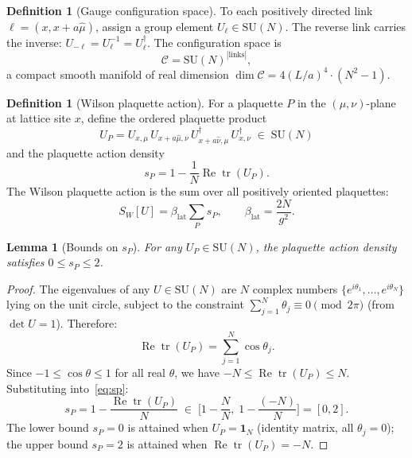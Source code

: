 \documentclass[12pt,a4paper]{article}
\theoremstyle{plain}
\newtheorem{lemma}[theorem]{Lemma}
\theoremstyle{definition}
\newtheorem{definition}[theorem]{Definition}
\theoremstyle{remark}
\begin{document}
\begin{definition}[Gauge configuration space]\label{def:config}
To each positively directed link $\ell = (x, x+a\hat{\mu})$, assign a group element $U_\ell \in \mathrm{SU}(N)$. The reverse link carries the inverse: $U_{-\ell} = U_\ell^{-1} = U_\ell^\dagger$. The configuration space is
\begin{equation}\label{eq:config}
\mathcal{C} = \mathrm{SU}(N)^{|\mathrm{links}|},
\end{equation}
a compact smooth manifold of real dimension $\dim\mathcal{C} = 4(L/a)^4 \cdot (N^2-1)$.
\end{definition}

\begin{definition}[Wilson plaquette action]\label{def:wilson}
For a plaquette $P$ in the $(\mu,\nu)$-plane at lattice site $x$, define the ordered plaquette product
\begin{equation}\label{eq:UP}
U_P = U_{x,\mu}\, U_{x+a\hat\mu,\nu}\, U_{x+a\hat\nu,\mu}^\dagger\, U_{x,\nu}^\dagger \;\in\; \mathrm{SU}(N)
\end{equation}
and the plaquette action density
\begin{equation}\label{eq:sp}
s_P = 1 - \frac{1}{N}\operatorname{Re}\operatorname{tr}(U_P).
\end{equation}
The Wilson plaquette action is the sum over all positively oriented plaquettes:
\begin{equation}\label{eq:SW}
S_W[U] = \beta_{\mathrm{lat}}\sum_{P} s_P, \qquad \beta_{\mathrm{lat}} = \frac{2N}{g^2}.
\end{equation}
\end{definition}

\begin{lemma}[Bounds on $s_P$]\label{lem:sp}
For any $U_P\in\mathrm{SU}(N)$, the plaquette action density satisfies $0\leq s_P\leq 2$.
\end{lemma}

\begin{proof}
The eigenvalues of any $U\in\mathrm{SU}(N)$ are $N$ complex numbers $\{e^{i\theta_1},\ldots,e^{i\theta_N}\}$ lying on the unit circle, subject to the constraint $\sum_{j=1}^N\theta_j\equiv 0\pmod{2\pi}$ (from $\det U=1$). Therefore:
\begin{equation}
\operatorname{Re}\operatorname{tr}(U_P) = \sum_{j=1}^N \cos\theta_j.
\end{equation}
Since $-1\leq\cos\theta\leq 1$ for all real $\theta$, we have $-N\leq\operatorname{Re}\operatorname{tr}(U_P)\leq N$. Substituting into~\eqref{eq:sp}:
\begin{equation}
s_P = 1 - \frac{\operatorname{Re}\operatorname{tr}(U_P)}{N} \;\in\; \bigg[1-\frac{N}{N},\;1-\frac{(-N)}{N}\bigg] = [0,2].
\end{equation}
The lower bound $s_P=0$ is attained when $U_P=\mathbf{1}_N$ (identity matrix, all $\theta_j=0$); the upper bound $s_P=2$ is attained when $\operatorname{Re}\operatorname{tr}(U_P)=-N$.
\end{proof}
\end{document}
